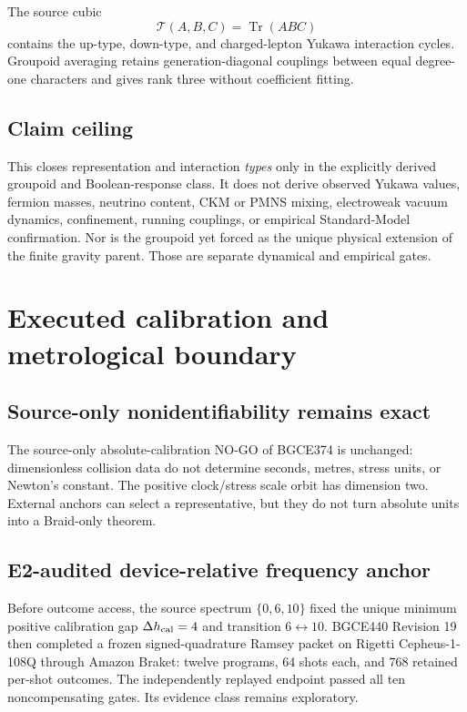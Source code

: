 \documentclass[11pt]{article}
\theoremstyle{definition}
\theoremstyle{remark}
\begin{document}
The source cubic
\begin{equation}
 \mathcal T(A,B,C)=\operatorname{Tr}(ABC)
\end{equation}
contains the up-type, down-type, and charged-lepton Yukawa interaction cycles. Groupoid averaging retains generation-diagonal couplings between equal degree-one characters and gives rank three without coefficient fitting.

\subsection{Claim ceiling}

This closes representation and interaction \emph{types} only in the explicitly derived groupoid and Boolean-response class. It does not derive observed Yukawa values, fermion masses, neutrino content, CKM or PMNS mixing, electroweak vacuum dynamics, confinement, running couplings, or empirical Standard-Model confirmation. Nor is the groupoid yet forced as the unique physical extension of the finite gravity parent. Those are separate dynamical and empirical gates.

\section{Executed calibration and metrological boundary}\label{sec:calibration083}

\subsection{Source-only nonidentifiability remains exact}

The source-only absolute-calibration NO-GO of BGCE374 is unchanged: dimensionless collision data do not determine seconds, metres, stress units, or Newton's constant. The positive clock/stress scale orbit has dimension two. External anchors can select a representative, but they do not turn absolute units into a Braid-only theorem.

\subsection{E2-audited device-relative frequency anchor}

Before outcome access, the source spectrum $\{0,6,10\}$ fixed the unique minimum positive calibration gap $\Delta h_{\rm cal}=4$ and transition $6\leftrightarrow10$. BGCE440 Revision 19 then completed a frozen signed-quadrature Ramsey packet on Rigetti Cepheus-1-108Q through Amazon Braket: twelve programs, 64 shots each, and 768 retained per-shot outcomes. The independently replayed endpoint passed all ten noncompensating gates. Its evidence class remains exploratory.
\end{document}
